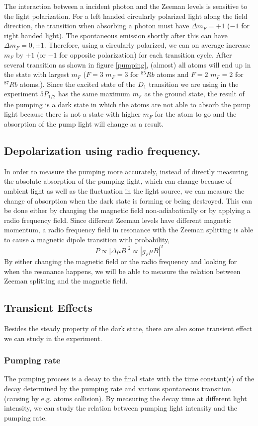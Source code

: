 \documentclass[aps,twocolumn,secnumarabic,balancelastpage,amsmath,amssymb,nofootinbib]{revtex4}
\newcommand{\abs}[1]{{\left|{#1}\right|}}
\begin{document}
The interaction between a incident photon and the Zeeman levels is sensitive to the light polarization. For a left handed circularly polarized light along the field direction, the transition when absorbing a photon must have $\Delta m_F=+1$ ($-1$ for right handed light). The spontaneous emission shortly after this can have $\Delta m_F=0, \pm1$. Therefore, using a circularly polarized, we can on average increase $m_F$ by $+1$ (or $-1$ for opposite polarization) for each transition cycle. After several transition as shown in figure \ref{pumping}, (almost) all atoms will end up in the state with largest $m_F$ ($F=3$ $m_F=3$ for ${}^{85}Rb$ atoms and $F=2$ $m_F=2$ for ${}^{87}Rb$ atoms.). Since the excited state of the $D_1$ transition we are using in the experiment $5P_{1/2}$ has the same maximum $m_F$ as the ground state, the result of the pumping is a dark state in which the atoms are not able to absorb the pump light because there is not a state with higher $m_F$ for the atom to go and the absorption of the pump light will change as a result.

\subsection{Depolarization using radio frequency.}
In order to measure the pumping more accurately, instead of directly measuring the absolute absorption of the pumping light, which can change because of ambient light as well as the fluctuation in the light source, we can measure the change of absorption when the dark state is forming or being destroyed. This can be done either by changing the magnetic field non-adiabatically or by applying a radio frequency field.
Since different Zeeman levels have different magnetic momentum, a radio frequency field in resonance with the Zeeman splitting is able to cause a magnetic dipole transition with probability,
\[ P\propto\abs{\Delta \mu B}^2\propto\abs{g_F\mu B}^2 \]
By either changing the magnetic field or the radio frequency and looking for when the resonance happens, we will be able to measure the relation between Zeeman splitting and the magnetic field.

\subsection{Transient Effects}
Besides the steady property of the dark state, there are also some transient effect we can study in the experiment.
\subsubsection{Pumping rate}
The pumping process is a decay to the final state with the time constant(s) of the decay determined by the pumping rate and various spontaneous transition (causing by e.g. atoms collision). By measuring the decay time at different light intensity, we can study the relation between pumping light intensity and the pumping rate.
\end{document}
